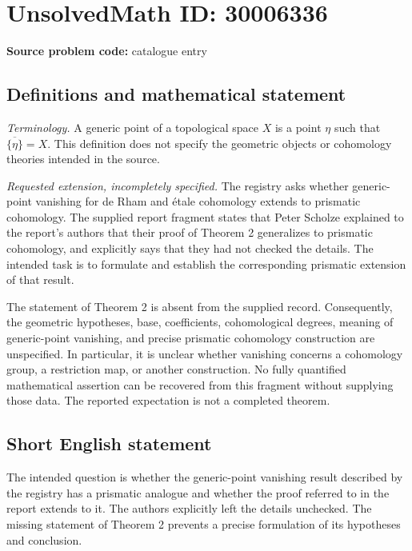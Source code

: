 \documentclass[11pt]{article}
\begin{document}
\section*{UnsolvedMath ID: 30006336}
\textbf{Source problem code:} catalogue entry
\subsection{Definitions and mathematical statement}
\emph{Terminology.} A generic point of a topological space \(X\) is a point \(\eta\) such that \(\overline{\{\eta\}}=X\). This definition does not specify the geometric objects or cohomology theories intended in the source.

\emph{Requested extension, incompletely specified.} The registry asks whether generic-point vanishing for de Rham and étale cohomology extends to prismatic cohomology. The supplied report fragment states that Peter Scholze explained to the report's authors that their proof of Theorem 2 generalizes to prismatic cohomology, and explicitly says that they had not checked the details. The intended task is to formulate and establish the corresponding prismatic extension of that result.

The statement of Theorem 2 is absent from the supplied record. Consequently, the geometric hypotheses, base, coefficients, cohomological degrees, meaning of generic-point vanishing, and precise prismatic cohomology construction are unspecified. In particular, it is unclear whether vanishing concerns a cohomology group, a restriction map, or another construction. No fully quantified mathematical assertion can be recovered from this fragment without supplying those data. The reported expectation is not a completed theorem.
\subsection{Short English statement}
The intended question is whether the generic-point vanishing result described by the registry has a prismatic analogue and whether the proof referred to in the report extends to it. The authors explicitly left the details unchecked. The missing statement of Theorem 2 prevents a precise formulation of its hypotheses and conclusion.
\end{document}
